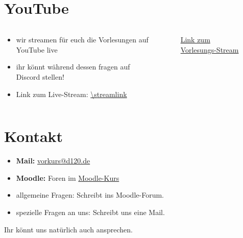 \section{YouTube}
\begin{frame}[c]
    \slidehead
    \begin{columns}[c]
        \begin{column}{.5\textwidth}
            \begin{itemize}
                \item wir streamen für euch die Vorlesungen auf YouTube live
                \item ihr könnt während dessen fragen auf Discord stellen!
                \item Link zum Live-Stream: \url{\streamlink}
            \end{itemize}
        \end{column}%
        \begin{column}{.5\textwidth}
            \begin{figure}
                \centering\mbox{}
                \qrcode[height=3cm]{\streamlink}
                \caption{\href{\streamlink}{Link zum Vorlesungs-Stream}}
            \end{figure}
        \end{column}
    \end{columns}
\end{frame}


\section{Kontakt}
\begin{frame}
    \slidehead
    \begin{itemize}
        \item \textbf{Mail:} \href{mailto:vorkurs@d120.de}{vorkurs@d120.de}
        \item \textbf{Moodle:}  Foren im \href{\moodlecourselink}{Moodle-Kurs}
    \end{itemize}
    \vspace{\fill}
    \begin{defBox}[title=Hinweise]%
        \vspace{-1em}
        \begin{itemize}
            \item allgemeine Fragen: Schreibt ins Moodle-Forum.
            \item spezielle Fragen an uns: Schreibt uns eine Mail.
        \end{itemize}
        Ihr könnt uns natürlich auch ansprechen.
    \end{defBox}
\end{frame}

